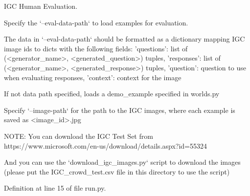 \begin{DoxyVerb}IGC Human Evaluation.

Specify the `--eval-data-path` to load examples for evaluation.

The data in `--eval-data-path` should be formatted as a dictionary
mapping IGC image ids to dicts with the following fields:
{
    'questions': list of (<generator_name>, <generated_question>) tuples,
    'responses': list of (<generator_name>, <generated_response>) tuples,
    'question': question to use when evaluating responses,
    'context': context for the image
}

If not data path specified, loads a demo_example specified in worlds.py

Specify `--image-path` for the path to the IGC images, where each example
is saved as <image_id>.jpg


NOTE: You can download the IGC Test Set from
    https://www.microsoft.com/en-us/download/details.aspx?id=55324

And you can use the `download_igc_images.py` script to download the images
(please put the IGC_crowd_test.csv file in this directory to use the script)
\end{DoxyVerb}
 

Definition at line 15 of file run.\+py.


